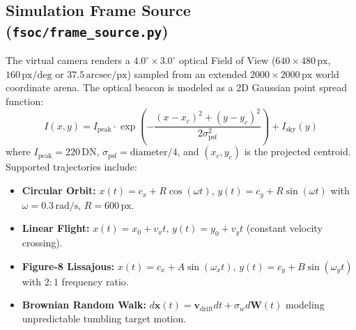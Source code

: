\documentclass[11pt,a4paper]{article}
\begin{document}
\subsection{Simulation Frame Source (\texttt{fsoc/frame\_source.py})}
The virtual camera renders a $4.0^\circ \times 3.0^\circ$ optical Field of View ($640 \times 480\,\text{px}$, $160\,\text{px/deg}$ or $37.5\,\text{arcsec/px}$) sampled from an extended $2000 \times 2000\,\text{px}$ world coordinate arena. The optical beacon is modeled as a 2D Gaussian point spread function:
\begin{equation}
    I(x, y) = I_{\text{peak}} \cdot \exp\left( -\frac{(x - x_c)^2 + (y - y_c)^2}{2\sigma_{\text{psf}}^2} \right) + I_{\text{sky}}(y)
\end{equation}
where $I_{\text{peak}} = 220\,\text{DN}$, $\sigma_{\text{psf}} = \text{diameter}/4$, and $(x_c, y_c)$ is the projected centroid. Supported trajectories include:
\begin{itemize}[noitemsep,topsep=2pt]
    \item \textbf{Circular Orbit:} $x(t) = c_x + R\cos(\omega t)$, $y(t) = c_y + R\sin(\omega t)$ with $\omega = 0.3\,\text{rad/s}$, $R = 600\,\text{px}$.
    \item \textbf{Linear Flight:} $x(t) = x_0 + v_x t$, $y(t) = y_0 + v_y t$ (constant velocity crossing).
    \item \textbf{Figure-8 Lissajous:} $x(t) = c_x + A\sin(\omega_x t)$, $y(t) = c_y + B\sin(\omega_y t)$ with $2:1$ frequency ratio.
    \item \textbf{Brownian Random Walk:} $d\mathbf{x}(t) = \mathbf{v}_{\text{drift}} dt + \sigma_w d\mathbf{W}(t)$ modeling unpredictable tumbling target motion.
\end{itemize}
\end{document}
